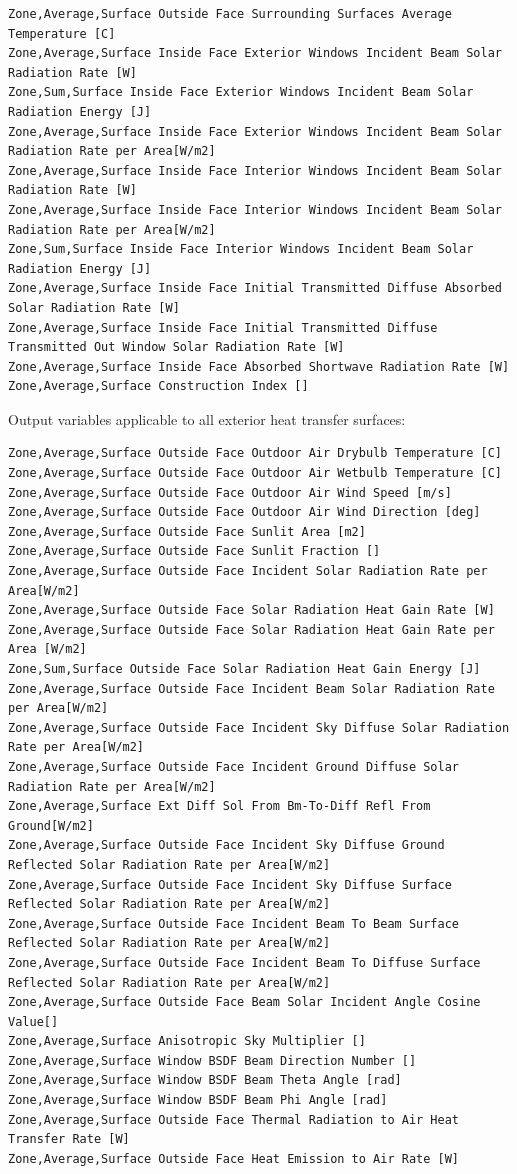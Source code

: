 \begin{lstlisting}
Zone,Average,Surface Outside Face Surrounding Surfaces Average Temperature [C]
Zone,Average,Surface Inside Face Exterior Windows Incident Beam Solar Radiation Rate [W]
Zone,Sum,Surface Inside Face Exterior Windows Incident Beam Solar Radiation Energy [J]
Zone,Average,Surface Inside Face Exterior Windows Incident Beam Solar Radiation Rate per Area[W/m2]
Zone,Average,Surface Inside Face Interior Windows Incident Beam Solar Radiation Rate [W]
Zone,Average,Surface Inside Face Interior Windows Incident Beam Solar Radiation Rate per Area[W/m2]
Zone,Sum,Surface Inside Face Interior Windows Incident Beam Solar Radiation Energy [J]
Zone,Average,Surface Inside Face Initial Transmitted Diffuse Absorbed Solar Radiation Rate [W]
Zone,Average,Surface Inside Face Initial Transmitted Diffuse Transmitted Out Window Solar Radiation Rate [W]
Zone,Average,Surface Inside Face Absorbed Shortwave Radiation Rate [W]
Zone,Average,Surface Construction Index []
\end{lstlisting}

Output variables applicable to all exterior heat transfer surfaces:

\begin{lstlisting}
Zone,Average,Surface Outside Face Outdoor Air Drybulb Temperature [C]
Zone,Average,Surface Outside Face Outdoor Air Wetbulb Temperature [C]
Zone,Average,Surface Outside Face Outdoor Air Wind Speed [m/s]
Zone,Average,Surface Outside Face Outdoor Air Wind Direction [deg]
Zone,Average,Surface Outside Face Sunlit Area [m2]
Zone,Average,Surface Outside Face Sunlit Fraction []
Zone,Average,Surface Outside Face Incident Solar Radiation Rate per Area[W/m2]
Zone,Average,Surface Outside Face Solar Radiation Heat Gain Rate [W]
Zone,Average,Surface Outside Face Solar Radiation Heat Gain Rate per Area [W/m2]
Zone,Sum,Surface Outside Face Solar Radiation Heat Gain Energy [J]
Zone,Average,Surface Outside Face Incident Beam Solar Radiation Rate per Area[W/m2]
Zone,Average,Surface Outside Face Incident Sky Diffuse Solar Radiation Rate per Area[W/m2]
Zone,Average,Surface Outside Face Incident Ground Diffuse Solar Radiation Rate per Area[W/m2]
Zone,Average,Surface Ext Diff Sol From Bm-To-Diff Refl From Ground[W/m2]
Zone,Average,Surface Outside Face Incident Sky Diffuse Ground Reflected Solar Radiation Rate per Area[W/m2]
Zone,Average,Surface Outside Face Incident Sky Diffuse Surface Reflected Solar Radiation Rate per Area[W/m2]
Zone,Average,Surface Outside Face Incident Beam To Beam Surface Reflected Solar Radiation Rate per Area[W/m2]
Zone,Average,Surface Outside Face Incident Beam To Diffuse Surface Reflected Solar Radiation Rate per Area[W/m2]
Zone,Average,Surface Outside Face Beam Solar Incident Angle Cosine Value[]
Zone,Average,Surface Anisotropic Sky Multiplier []
Zone,Average,Surface Window BSDF Beam Direction Number []
Zone,Average,Surface Window BSDF Beam Theta Angle [rad]
Zone,Average,Surface Window BSDF Beam Phi Angle [rad]
Zone,Average,Surface Outside Face Thermal Radiation to Air Heat Transfer Rate [W]
Zone,Average,Surface Outside Face Heat Emission to Air Rate [W]
\end{lstlisting}

